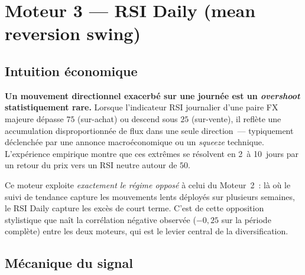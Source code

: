 \documentclass[11pt, a4paper]{scrartcl}
\begin{document}
\section{Moteur 3 --- RSI Daily (mean reversion swing)}
\label{sec:rsi_daily}

\subsection{Intuition économique}

\begin{thesisbox}
\textbf{Un mouvement directionnel exacerbé sur une journée est un \emph{overshoot}
statistiquement rare.} Lorsque l'indicateur RSI journalier d'une paire FX
majeure dépasse $75$ (sur-achat) ou descend sous $25$ (sur-vente), il reflète
une accumulation disproportionnée de flux dans une seule direction~--- typiquement
déclenchée par une annonce macroéconomique ou un \emph{squeeze} technique.
L'expérience empirique montre que ces extrêmes se résolvent en 2~à 10~jours
par un retour du prix vers un RSI neutre autour de $50$.
\end{thesisbox}

Ce moteur exploite \emph{exactement le régime opposé} à celui du Moteur~2~: là où le suivi de tendance capture les mouvements lents déployés sur plusieurs semaines, le RSI Daily capture les excès de court terme. C'est de cette opposition stylistique que naît la corrélation négative observée ($-0{,}25$ sur la période complète) entre les deux moteurs, qui est le levier central de la diversification.

\subsection{Mécanique du signal}
\end{document}
